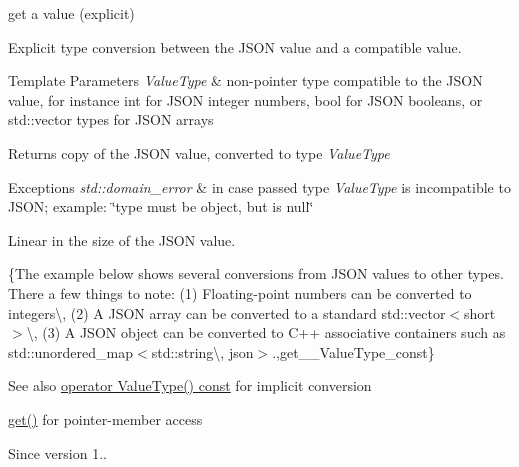 get a value (explicit) 

Explicit type conversion between the J\+S\+ON value and a compatible value.


\begin{DoxyTemplParams}{Template Parameters}
{\em Value\+Type} & non-\/pointer type compatible to the J\+S\+ON value, for instance {\ttfamily int} for J\+S\+ON integer numbers, {\ttfamily bool} for J\+S\+ON booleans, or {\ttfamily std\+::vector} types for J\+S\+ON arrays\\
\hline
\end{DoxyTemplParams}
\begin{DoxyReturn}{Returns}
copy of the J\+S\+ON value, converted to type {\itshape Value\+Type} 
\end{DoxyReturn}

\begin{DoxyExceptions}{Exceptions}
{\em std\+::domain\+\_\+error} & in case passed type {\itshape Value\+Type} is incompatible to J\+S\+ON; example\+: {\ttfamily \char`\"{}type must be object, but is null\char`\"{}}\\
\hline
\end{DoxyExceptions}
Linear in the size of the J\+S\+ON value.

\{The example below shows several conversions from J\+S\+ON values to other types. There a few things to note\+: (1) Floating-\/point numbers can be converted to integers\textbackslash{}, (2) A J\+S\+ON array can be converted to a standard {\ttfamily std\+::vector$<$short$>$}\textbackslash{}, (3) A J\+S\+ON object can be converted to C++ associative containers such as {\ttfamily std\+::unordered\+\_\+map$<$std\+::string\textbackslash{}, json$>$}.,get\+\_\+\+\_\+\+Value\+Type\+\_\+const\}

\begin{DoxySeeAlso}{See also}
\hyperlink{a00025_aef496a56163710084e13612ab73e6ed2}{operator Value\+Type() const} for implicit conversion 

\hyperlink{a00025_ac5693cff1df0775cd3fbe960412cde4b}{get()} for pointer-\/member access
\end{DoxySeeAlso}
\begin{DoxySince}{Since}
version 1.. 
\end{DoxySince}

